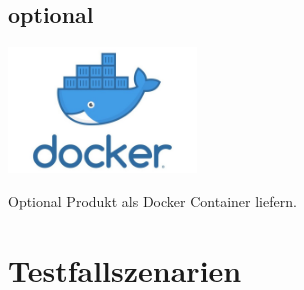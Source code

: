 \documentclass[xcolor=dvipsnames]{beamer}
\begin{document}
\subsection{optional}
\begin{frame}
         \includegraphics[width=5cm]{img/docker.jpg}
         \begin{block}{Optional}
          Produkt als Docker Container liefern.
        \end{block}
\end{frame}
\section{Testfallszenarien}
\end{document}
